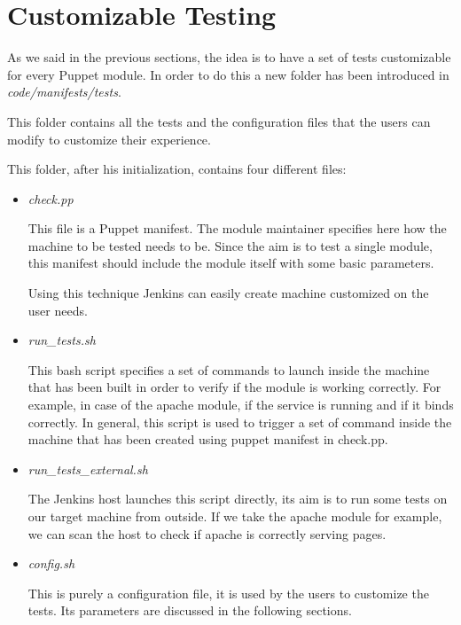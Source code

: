\section{Customizable Testing}

As we said in the previous sections, the idea is to have a set of tests
customizable for every Puppet module. In order to do this a new folder has
been introduced in \textit{code/manifests/tests}.

This folder contains all the tests and the configuration files that the
users can modify to customize their experience.

This folder, after his initialization, contains four different files:

\begin{itemize}
  \item \textit{check.pp}

This file is a Puppet manifest. The module maintainer specifies here how
the machine to be tested needs to be. Since the aim is to test a single
module, this manifest should include the module itself with some basic
parameters.

Using this technique Jenkins can easily create machine customized on the
user needs.

  \item \textit{run\_tests.sh}

This bash script specifies a set of commands to launch inside the machine
that has been built in order to verify if the module is working correctly.
For example, in case of the apache module, if the service is running and
if it binds correctly. In general, this script is used to trigger a set of
command inside the machine that has been created using puppet manifest in
check.pp.

  \item \textit{run\_tests\_external.sh}
  
The Jenkins host launches this script directly, its aim is to run some
tests on our target machine from outside. If we take the apache module for
example, we can scan the host to check if apache is correctly serving
pages.

  \item \textit{config.sh}
  
This is purely a configuration file, it is used by the users to customize
the tests. Its parameters are discussed in the following sections.

\end{itemize}

